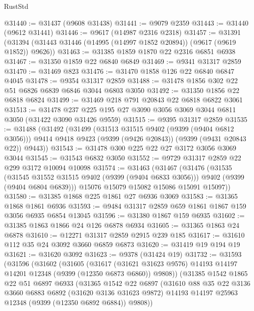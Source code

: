 \begin{lexlean}{RustStd}
\begin{coremodule}
@31440 := @31437 (@9608 @31438)
@31441 := @9079 @2359
@31443 := @31440 (@9612 @31441)
@31446 := @9617 (@14987 @2316 @2318)
@31457 := @31391 (@31394 (@31443 @31446 (@14995 (@14997 @1852 @20894)) (@9617 (@9619 @1852)) @9626))
@31463 := @31385 @1859 @1870 @22 @2316 @6851 @6938
@31467 := @31350 @1859 @22 @6840 @6849
@31469 := @9341 @31317 @2859
@31470 := @31469 @823
@31476 := @31470 @1858 @126 @22 @6840 @6847 @4045
@31478 := @9354 @31317 @2859
@31488 := @31478 @1856 @302 @22 @51 @6826 @6839 @6846 @3044 @6803 @3050
@31492 := @31350 @1856 @22 @6818 @6824
@31499 := @31469 @218 @791 @20843 @22 @6818 @6822 @3061
@31513 := @31478 @237 @225 @195 @27 @3090 @3056 @3069 @3044 @6811 @3050 (@31422 @3090 @31426 @9559)
@31515 := @9395 @31317 @2859
@31535 := @31488
    (@31492
      (@31499
        (@31513 @31515 @9402 (@9399 (@9404 @6812 @3056)))
        @9414
        @9418
        @9423
        (@9399 (@9426 @20843))
        (@9399 (@9431 @20843 @22))
        @9443))
@31543 := @31478 @300 @225 @22 @27 @3172 @3056 @3069 @3044
@31545 := @31543 @6832 @3050
@31552 := @9729 @31317 @2859 @22 @299 @3172 @10094 @10098
@31574 := @31463
    (@31467
      (@31476
        (@31535
          (@31545 @31552 @31515 @9402 (@9399 (@9404 @6833 @3056)))
          @9402
          (@9399 (@9404 @6804 @6839)))
        @15076
        @15079
        @15082
        @15086
        @15091
        @15097))
@31580 := @31385 @1868 @225 @1861 @27 @6936 @3069
@31583 := @31365 @1868 @1861 @6936
@31593 := @9484 @31317 @2859 @659 @1861 @1867 @159 @3056 @6935 @6854 @13045
@31596 := @31380 @1867 @159 @6935
@31602 := @31385 @1863 @1866 @24 @126 @6878 @6934
@31605 := @31365 @1863 @24 @6878
@31610 := @12271 @31317 @2859 @2915 @239 @185
@31617 := @31610 @112 @35 @24 @3092 @3660 @6859 @6873
@31620 := @31419 @19 @194 @19
@31621 := @31620 @3092
@31623 := @9378 (@31424 @19)
@31732 := @31593
    (@31596
      (@31602
        (@31605
          (@31617
            (@31621 @31623 @9576)
            @14193
            @14197
            @14201
            @12348
            (@9399 (@12350 @6873 @6860))
            @9808))
        (@31385
          @1542
          @1865
          @22
          @51
          @6897
          @6933
          (@31365
            @1542
            @22
            @6897
            (@31610
              @88
              @35
              @22
              @3136
              @3660
              @6883
              @6892
              (@31620 @3136 @31623 @9872)
              @14193
              @14197
              @25963
              @12348
              (@9399 (@12350 @6892 @6884))
              @9808))

\end{coremodule}
\end{lexlean}
